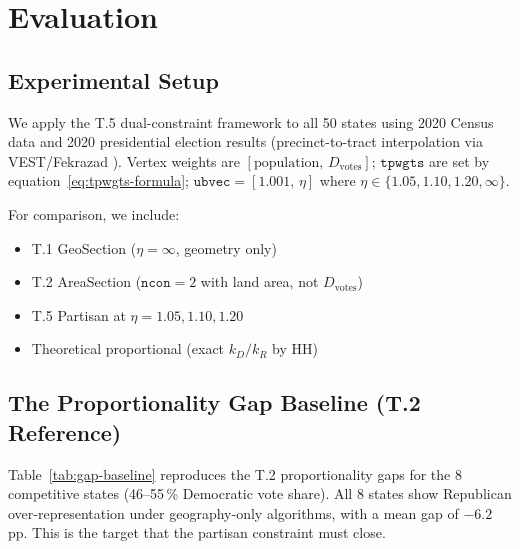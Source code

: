 \section{Evaluation}
\label{sec:eval}

\subsection{Experimental Setup}

We apply the T.5 dual-constraint framework to all 50 states using 2020 Census
data and 2020 presidential election results (precinct-to-tract interpolation
via VEST/Fekrazad \citep{fekrazad2021}).
Vertex weights are $[\text{population},\, D_{\text{votes}}]$;
$\mathtt{tpwgts}$ are set by equation~\eqref{eq:tpwgts-formula};
$\mathtt{ubvec} = [1.001,\, \eta]$ where $\eta \in \{1.05, 1.10, 1.20, \infty\}$.

For comparison, we include:
\begin{itemize}
  \item T.1 GeoSection ($\eta = \infty$, geometry only)
  \item T.2 AreaSection ($\mathtt{ncon}=2$ with land area, not $D_{\text{votes}}$)
  \item T.5 Partisan at $\eta = 1.05, 1.10, 1.20$
  \item Theoretical proportional (exact $k_D/k_R$ by HH)
\end{itemize}

\subsection{The Proportionality Gap Baseline (T.2 Reference)}

Table~\ref{tab:gap-baseline} reproduces the T.2 proportionality gaps for
the 8 competitive states (46--55\,\% Democratic vote share).
All 8 states show Republican over-representation under geography-only algorithms,
with a mean gap of $-6.2$\,pp.
This is the target that the partisan constraint must close.

